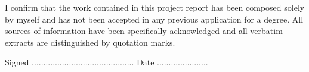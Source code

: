         \begin{minipage}{4.5in}
                \parindent=0pt
                I confirm that the work contained in this \@rpttype \space project report has been composed solely by myself and has not been accepted in any previous application for a degree. All sources of information have been specifically acknowledged and all verbatim extracts are distinguished by quotation marks.
                \par
                \vskip 2in
                 Signed ............................................ \hspace{0.5 in} Date ......................\\
                 \hspace*{0.4 in} \@author 
                 \par
        \end{minipage}%

